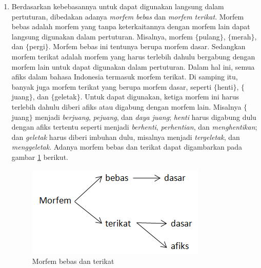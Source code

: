 \begin{enumerate}
	\item Berdasarkan kebebasannya untuk dapat digunakan langsung dalam pertuturan, dibedakan adanya \textit{morfem bebas} dan \textit{morfem terikat}. Morfem bebas adalah morfem yang tanpa keterkaitannya dengan morfem lain dapat langsung digunakan dalam pertuturan. Misalnya, morfem $\lbrace$pulang$\rbrace$, $\lbrace$merah$\rbrace$, dan $\lbrace$pergi$\rbrace$. Morfem bebas ini tentunya berupa morfem dasar. Sedangkan morfem terikat adalah morfem yang harus terlebih dahulu bergabung dengan morfem lain untuk dapat digunakan dalam pertuturan. Dalam hal ini, semua afiks dalam bahasa Indonesia termasuk morfem terikat. Di samping itu, banyak juga morfem terikat yang berupa morfem dasar, seperti $\lbrace$henti$\rbrace$, $\lbrace$juang$\rbrace$, dan $\lbrace$geletak$\rbrace$. Untuk dapat digunakan, ketiga morfem ini harus terlebih dahulu diberi afiks atau digabung dengan morfem lain. Misalnya $\lbrace$juang$\rbrace$ menjadi \textit{berjuang}, \textit{pejuang}, dan \textit{daya juang}; \textit{henti} harus digabung dulu dengan afiks tertentu seperti menjadi \textit{berhenti}, \textit{perhentian}, dan \textit{menghentikan}; dan \textit{geletak} harus diberi imbuhan dulu, misalnya menjadi \textit{tergeletak}, dan \textit{menggeletak}. Adanya morfem bebas dan terikat dapat digambarkan pada gambar \ref{gambar-morfem-bebas-terikat} berikut.
	
	\begin{figure}[H]
	\centering
	\includegraphics[scale=1]{Gambar/gambar-morfem-bebas-terikat}
	\caption[Morfem bebas dan terikat]{Morfem bebas dan terikat\cite{chaer:08:morfologi}} 
	\label{gambar-morfem-bebas-terikat}
	\end{figure}
	

\end{enumerate}
